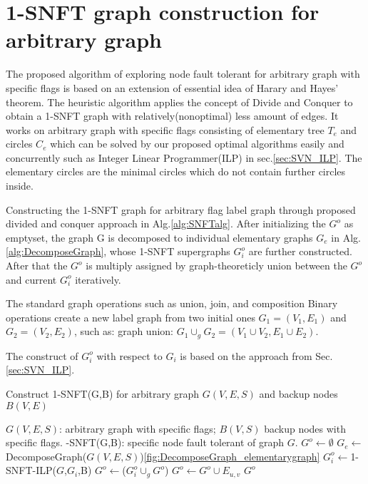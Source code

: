
\section{1-SNFT graph construction for arbitrary graph}
The proposed algorithm of exploring node fault tolerant for arbitrary graph with specific flags is based on an extension of essential idea of Harary and Hayes' theorem\cite{harary1996node}. The heuristic algorithm applies the concept of Divide and Conquer to obtain a 1-SNFT graph with relatively(nonoptimal) less amount of edges. It works on arbitrary graph with specific flags consisting of elementary tree $T_e$ and circles $C_e$ which can be solved by our proposed optimal algorithms easily and concurrently such as Integer Linear Programmer(ILP) in sec.\ref{sec:SVN_ILP}. The elementary circles are the minimal circles which do not contain further circles inside.

Constructing the 1-SNFT graph for arbitrary flag label graph through proposed divided and conquer approach in Alg.\ref{alg:SNFTalg}. After initializing the $G^o$ as emptyset, the graph G is decomposed to individual elementary graphs $G_e$ in Alg.\ref{alg:DecomposeGraph}, whose 1-SNFT supergraphs $G^o_i$ are further constructed. After that the $G^o$ is multiply assigned by graph-theoreticly union between the $G^o$ and current $G^o_i$ iteratively.

The standard graph operations such as union, join, and composition\cite{west2001introduction} Binary operations create a new label graph from two initial ones $G_1 = (V_1, E_1)$ and $G_2 = (V_2, E_2)$, such as:
graph union: $G_1 \cup_g G_2 = (V_1 \cup V_2, E_1 \cup E_2)$.

The construct of $G^o_i$ with respect to $G_i$ is based on the approach from Sec.\ref{sec:SVN_ILP}.


\begin{algorithm}
\caption{Construct 1-SNFT(G,B) for arbitrary graph $G(V,E,S)$ and backup nodes $B(V,E)$}
\label{alg:SNFTalg}
\begin{algorithmic}[1]
\REQUIRE $G(V,E,S)$: arbitrary graph with specific flags; $B(V,S)$ backup nodes with specific flags.
-SNFT(G,B): specific node fault tolerant of graph $G$.
\STATE $G^o\leftarrow \emptyset$
\STATE $G_e\leftarrow$ DecomposeGraph($G(V,E,S)$)\ref{fig:DecomposeGraph_elementarygraph}
\STATE $G_i^o\leftarrow$1-SNFT-ILP($G$,$G_i$,B)
\STATE $G^o\leftarrow$($G_i^o \cup_g G^o$)
\ENDFOR
{}
\STATE $G^o\leftarrow G^o\cup E_{u,v}$
\ENDFOR
\RETURN $G^o$
\end{algorithmic}
\end{algorithm}





